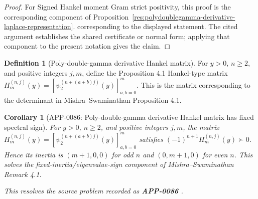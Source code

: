 \documentclass[11pt]{article}
\numberwithin{equation}{section}
\newtheorem{corollary}[theorem]{Corollary}
\theoremstyle{definition}
\newtheorem{definition}{Definition}[section]
\theoremstyle{remark}
\newcommand{\1}{\mathbf 1}
\begin{document}
\begin{proof}
For Signed Hankel moment Gram strict positivity, this proof is the corresponding component of Proposition~\ref{res:polydoublegamma-derivative-laplace-representation}.  corresponding to the displayed statement.  The cited argument establishes the shared certificate or normal form; applying that component to the present notation gives the claim.
\end{proof}

\begin{definition}[Poly-double-gamma derivative Hankel matrix]
\label{res:polydoublegamma-derivative-hankel-matrix}
For \(y>0\), \(n\ge2\), and positive integers \(j,m\), define the Proposition 4.1 Hankel-type matrix \(H_m^{(n,j)}(y)=[\psi_2^{(n+(a+b)j)}(y)]_{a,b=0}^{m}\). This is the matrix corresponding to the determinant in Mishra--Swaminathan Proposition 4.1.
\end{definition}

\begin{corollary}[APP-0086: Poly-double-gamma derivative Hankel matrix has fixed spectral sign]
\label{res:polydoublegamma-hankel-matrix-inertia}
For \(y>0\), \(n\ge2\), and positive integers \(j,m\), the matrix \(H_m^{(n,j)}(y)=[\psi_2^{(n+(a+b)j)}(y)]_{a,b=0}^m\) satisfies \((-1)^{n+1}H_m^{(n,j)}(y)\succ0\). Hence its inertia is \((m+1,0,0)\) for odd \(n\) and \((0,m+1,0)\) for even \(n\). This solves the fixed-inertia/eigenvalue-sign component of Mishra--Swaminathan Remark 4.1.



This resolves the source problem recorded as \textbf{APP-0086} \cite{app-app-0086-source}.
\end{corollary}
\end{document}

